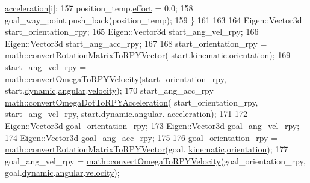 \begin{DoxyCode}
      \hyperlink{structrobotis__manipulator_1_1_dynamicvector_afc83eba2d67af4c23150a08824f0f01e}{acceleration}[i];
157     position\_temp.\hyperlink{structrobotis__manipulator_1_1_point_add1a7019fc87cc2ac9bdf033372a9bb6}{effort} = 0.0;
158     goal\_way\_point.push\_back(position\_temp);
159   \}
161 
163 
164   Eigen::Vector3d start\_orientation\_rpy;
165   Eigen::Vector3d start\_ang\_vel\_rpy;
166   Eigen::Vector3d start\_ang\_acc\_rpy;
167 
168   start\_orientation\_rpy = \hyperlink{namespacerobotis__manipulator_1_1math_adaa070908c6328c2459be5eaf64af68f}{math::convertRotationMatrixToRPYVector}(
      start.\hyperlink{structrobotis__manipulator_1_1_pose_a7215a37d50e62643f1523d3fa40a36e9}{kinematic}.\hyperlink{structrobotis__manipulator_1_1_kinematic_pose_a0506da3cc344d21656fdd1befdd7fa27}{orientation});
169   start\_ang\_vel\_rpy = \hyperlink{namespacerobotis__manipulator_1_1math_ae69e1aacc48ed72442eb4dc82e280be0}{math::convertOmegaToRPYVelocity}(start\_orientation\_rpy,
       start.\hyperlink{structrobotis__manipulator_1_1_pose_a8accf10d21933e07ade2728fcccf4ae6}{dynamic}.\hyperlink{structrobotis__manipulator_1_1_dynamic_pose_a424459b0d1108f1e65594f5d193cbae6}{angular}.\hyperlink{structrobotis__manipulator_1_1_dynamicvector_a6bbccf8316887a8da3cd6aa065f3beac}{velocity});
170   start\_ang\_acc\_rpy = \hyperlink{namespacerobotis__manipulator_1_1math_aabd3cc7c059a6372e917bc98a3e5c1dd}{math::convertOmegaDotToRPYAcceleration}(
      start\_orientation\_rpy, start\_ang\_vel\_rpy, start.\hyperlink{structrobotis__manipulator_1_1_pose_a8accf10d21933e07ade2728fcccf4ae6}{dynamic}.\hyperlink{structrobotis__manipulator_1_1_dynamic_pose_a424459b0d1108f1e65594f5d193cbae6}{angular}.
      \hyperlink{structrobotis__manipulator_1_1_dynamicvector_afc83eba2d67af4c23150a08824f0f01e}{acceleration});
171 
172   Eigen::Vector3d goal\_orientation\_rpy;
173   Eigen::Vector3d goal\_ang\_vel\_rpy;
174   Eigen::Vector3d goal\_ang\_acc\_rpy;
175 
176   goal\_orientation\_rpy = \hyperlink{namespacerobotis__manipulator_1_1math_adaa070908c6328c2459be5eaf64af68f}{math::convertRotationMatrixToRPYVector}(goal.
      \hyperlink{structrobotis__manipulator_1_1_pose_a7215a37d50e62643f1523d3fa40a36e9}{kinematic}.\hyperlink{structrobotis__manipulator_1_1_kinematic_pose_a0506da3cc344d21656fdd1befdd7fa27}{orientation});
177   goal\_ang\_vel\_rpy = \hyperlink{namespacerobotis__manipulator_1_1math_ae69e1aacc48ed72442eb4dc82e280be0}{math::convertOmegaToRPYVelocity}(goal\_orientation\_rpy, 
      goal.\hyperlink{structrobotis__manipulator_1_1_pose_a8accf10d21933e07ade2728fcccf4ae6}{dynamic}.\hyperlink{structrobotis__manipulator_1_1_dynamic_pose_a424459b0d1108f1e65594f5d193cbae6}{angular}.\hyperlink{structrobotis__manipulator_1_1_dynamicvector_a6bbccf8316887a8da3cd6aa065f3beac}{velocity});

\end{DoxyCode}
